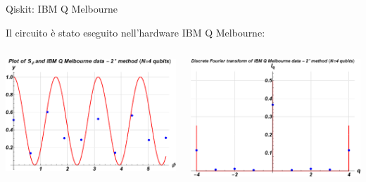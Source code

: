 \documentclass{beamer}
\renewcommand{\'}[0]{\`}
\begin{document}
	\begin{frame}{Qiskit: IBM Q Melbourne}

	Il circuito è stato eseguito nell'hardware \alert{IBM Q Melbourne}:
	\vspace{0.5cm}
	
	\begin{columns}
	
	\centering \includegraphics[width=1\textwidth]{./image/S4.eps} 		

	\centering \includegraphics[width=1\textwidth]{./image/I4.eps} 

	\end{columns}
		
	\end{frame}
		
\end{document}
